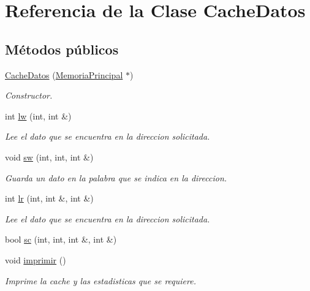\hypertarget{classCacheDatos}{}\section{Referencia de la Clase Cache\+Datos}
\label{classCacheDatos}
\subsection*{Métodos públicos}
\begin{DoxyCompactItemize}
\item 
\hyperlink{classCacheDatos_ab07b4bbe9bcc0cf9597d830ac6ff1eef}{Cache\+Datos} (\hyperlink{classMemoriaPrincipal}{Memoria\+Principal} $\ast$)
\begin{DoxyCompactList}\small\item\em Constructor. \end{DoxyCompactList}\item 
int \hyperlink{classCacheDatos_abe68f33f8549a4d0467c6c0b2eb6c463}{lw} (int, int \&)
\begin{DoxyCompactList}\small\item\em Lee el dato que se encuentra en la direccion solicitada. \end{DoxyCompactList}\item 
void \hyperlink{classCacheDatos_adcc01761d92c14b36a164f4367898277}{sw} (int, int, int \&)
\begin{DoxyCompactList}\small\item\em Guarda un dato en la palabra que se indica en la direccion. \end{DoxyCompactList}\item 
int \hyperlink{classCacheDatos_a358cf45084deeeca1bf689a22b28cb27}{lr} (int, int \&, int \&)
\begin{DoxyCompactList}\small\item\em Lee el dato que se encuentra en la direccion solicitada. \end{DoxyCompactList}\item 
bool \hyperlink{classCacheDatos_a3f45fa41418612c913095caa7f2ba9a4}{sc} (int, int, int \&, int \&)
\item 
\mbox{\label{classCacheDatos_ae38afe483dfc35d8159b828d4785333f}} 
void \hyperlink{classCacheDatos_ae38afe483dfc35d8159b828d4785333f}{imprimir} ()
\begin{DoxyCompactList}\small\item\em Imprime la cache y las estadisticas que se requiere. \end{DoxyCompactList}\end{DoxyCompactItemize}


